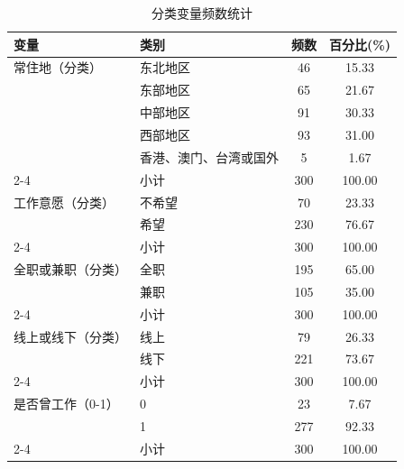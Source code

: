 \begin{table}[htbp]
\centering
\caption{分类变量频数统计}
\label{tab:descriptive_categorical}
\begin{tabular}{llcc}
\toprule
变量 & 类别 & 频数 & 百分比(\%) \\
\midrule
常住地（分类） & 东北地区 & 46 & 15.33 \\
 & 东部地区 & 65 & 21.67 \\
 & 中部地区 & 91 & 30.33 \\
 & 西部地区 & 93 & 31.00 \\
 & 香港、澳门、台湾或国外 & 5 & 1.67 \\
\cmidrule(lr){2-4}
 & 小计 & 300 & 100.00 \\
\midrule
工作意愿（分类） & 不希望 & 70 & 23.33 \\
 & 希望 & 230 & 76.67 \\
\cmidrule(lr){2-4}
 & 小计 & 300 & 100.00 \\
\midrule
全职或兼职（分类） & 全职 & 195 & 65.00 \\
 & 兼职 & 105 & 35.00 \\
\cmidrule(lr){2-4}
 & 小计 & 300 & 100.00 \\
\midrule
线上或线下（分类） & 线上 & 79 & 26.33 \\
 & 线下 & 221 & 73.67 \\
\cmidrule(lr){2-4}
 & 小计 & 300 & 100.00 \\
\midrule
是否曾工作（0-1） & 0 & 23 & 7.67 \\
 & 1 & 277 & 92.33 \\
\cmidrule(lr){2-4}
 & 小计 & 300 & 100.00 \\

\bottomrule
\end{tabular}
\end{table}
